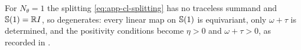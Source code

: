 For $N_\theta = 1$ the splitting \eqref{eq:app-cl-splitting} has no traceless summand and $\mathbb{S}(1) = \mathbb{R} I$, so  degenerates: every linear map on $\mathbb{S}(1)$ is equivariant, only $\omega + \tau$ is determined, and the positivity conditions become $\eta > 0$ and $\omega + \tau > 0$, as recorded in .

